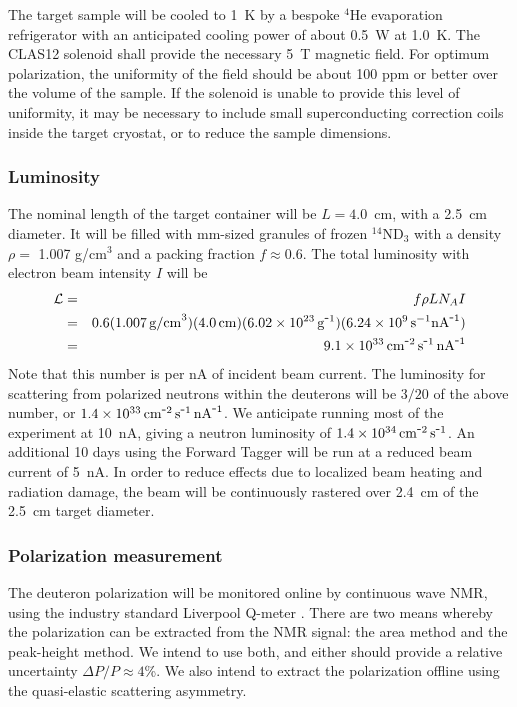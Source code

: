 The target sample will be cooled to 1~K by a bespoke $^4$He evaporation refrigerator with an anticipated cooling power of about 0.5~W at 1.0~K.  The CLAS12 solenoid shall provide the necessary 5~T magnetic field.  For optimum polarization, the uniformity of the field should be about 100 ppm or better over the volume of the sample.  If the solenoid is unable to provide this level of uniformity, it may be necessary to include small superconducting correction
coils inside the target cryostat, or to reduce the sample dimensions.  

\subsubsection{Luminosity}\label{sec_luminosity}
The nominal length of the target container will be $L=4.0$~cm, with a 2.5~cm diameter. 
It will be filled with mm-sized granules of frozen $^{14}$ND$_3$ with a density $\rho =$ 1.007 g/cm$^3$ and a packing fraction $f\approx0.6$.  The total luminosity with electron beam intensity $I$ will be 
\begin{eqnarray}
	\mathcal{L}  & = & f \rho L N_A I   \\
& = & 0.6(1.007\, {\rm g/cm}^3)(4.0\,{\rm cm})(6.02\times10^{23}\,{\rm g}^{\minus 1})(6.24\times10^9\,{\rm s}^{-1}{\rm nA}^{\minus 1}) \nonumber \\
	                   & = & 9.1 \times 10^{33} \, {\rm cm}^{\minus 2} \,{\rm s}^{\minus 1} \,{\rm nA}^{\minus 1} \nonumber
\end{eqnarray}
Note that this number is per nA of incident beam current.  
The luminosity for scattering from polarized neutrons
within the deuterons will be $3/20$ of the above number, or 
$1.4 \times 10^{33}\,{\rm cm}^{\minus 2} \, {\rm s}^{\minus 1} \, {\rm nA}^{\minus 1}$.
We anticipate running most of the experiment at 10~nA, giving a neutron luminosity of $1.4\times10^{34} 
\,{\rm cm}^{\minus 2} \, {\rm s}^{\minus 1}$.  An additional 10 days using the Forward Tagger will be run at a reduced beam current of 5~nA.  In order to reduce effects due to localized beam heating and radiation damage, the beam will be continuously rastered over 2.4~cm of the 2.5~cm target diameter.


\subsubsection{Polarization measurement}\label{sec_target_polarization}
The deuteron polarization will be monitored online by continuous wave NMR, using the industry standard
Liverpool Q-meter \cite{Court1993}.    There are two means whereby the polarization can be extracted from the NMR signal: the area method and the peak-height method.  We intend to use both, and either should provide a relative uncertainty $\Delta P/P \approx 4$\%.  We also intend to extract the polarization offline using the
quasi-elastic scattering asymmetry.

